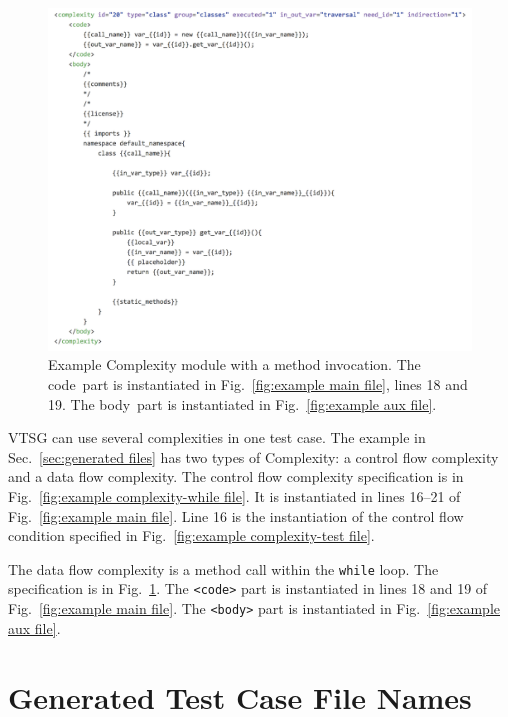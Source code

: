 \documentclass[12pt]{article}
\begin{document}
\begin{figure}[htbp]
  \includegraphics[width=\linewidth]{fig_Complexity_file_method.png}
  \caption{Example Complexity module with a method invocation.  
  The \texlangle code\texrangle\  part is instantiated in
  Fig.~\ref{fig:example main file}, lines 18 and 19. 
  The \texlangle body\texrangle\  part is instantiated in
  Fig.~\ref{fig:example aux file}.}
  \label{fig:example complexity-method file}
\end{figure}

VTSG can use several complexities in one test case.
The example in Sec.~\ref{sec:generated files} has two types of
Complexity: a control flow complexity and a data flow complexity. 
The control flow complexity specification is in 
Fig.~\ref{fig:example complexity-while file}.  It is instantiated in 
lines 16--21 of
Fig.~\ref{fig:example main file}.  Line 16 is the instantiation of 
the control flow condition
specified in Fig.~\ref{fig:example complexity-test file}.

The data flow complexity is a method call within the \verb|while| loop.  
The specification
is in Fig.~\ref{fig:example complexity-method file}.  
The \verb|<code>|
part is instantiated in lines 18 and 19 of 
Fig.~\ref{fig:example main file}. 
The \verb|<body>| part is instantiated in
Fig.~\ref{fig:example aux file}.


\section{Generated Test Case File Names}
\end{document}
